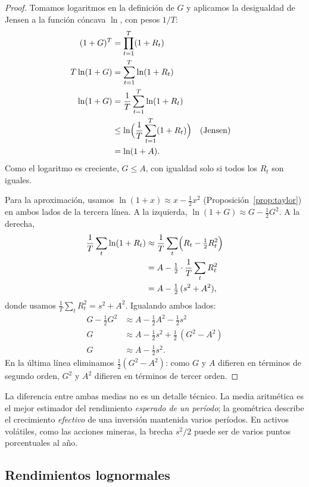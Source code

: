 \begin{proof}
Tomamos logaritmos en la definición de $G$ y aplicamos la desigualdad de Jensen a la función cóncava
$\ln$, con pesos $1/T$:
\begin{align*}
  (1+G)^T        &= \prod_{t=1}^T(1+R_t)\\
  T\ln(1+G)      &= \sum_{t=1}^T\ln(1+R_t)\\
  \ln(1+G)       &= \frac1T\sum_{t=1}^T\ln(1+R_t)\\
                 &\le \ln\Bigl(\frac1T\sum_{t=1}^T(1+R_t)\Bigr) && \text{(Jensen)}\\
                 &= \ln(1+A).
\end{align*}
Como el logaritmo es creciente, $G\le A$, con igualdad solo si todos los $R_t$ son iguales.

Para la aproximación, usamos $\ln(1+x)\approx x-\tfrac12x^2$ (Proposición~\ref{prop:taylor}) en ambos
lados de la tercera línea. A la izquierda, $\ln(1+G)\approx G-\tfrac12G^2$. A la derecha,
\begin{align*}
  \frac1T\sum_t\ln(1+R_t) &\approx \frac1T\sum_t\Bigl(R_t-\tfrac12R_t^2\Bigr)\\
                          &= A-\tfrac12\cdot\frac1T\sum_tR_t^2\\
                          &= A-\tfrac12\,(s^2+A^2),
\end{align*}
donde usamos $\frac1T\sum_tR_t^2=s^2+A^2$. Igualando ambos lados:
\begin{align*}
  G-\tfrac12G^2 &\approx A-\tfrac12A^2-\tfrac12s^2\\
  G             &\approx A-\tfrac12s^2+\tfrac12\,(G^2-A^2)\\
  G             &\approx A-\tfrac12s^2.
\end{align*}
En la última línea eliminamos $\tfrac12(G^2-A^2)$: como $G$ y $A$ difieren en términos de segundo orden,
$G^2$ y $A^2$ difieren en términos de tercer orden.
\end{proof}

La diferencia entre ambas medias no es un detalle técnico. La media aritmética es el mejor estimador del
rendimiento \emph{esperado de un período}; la geométrica describe el crecimiento \emph{efectivo} de una
inversión mantenida varios períodos. En activos volátiles, como las acciones mineras, la brecha
$s^2/2$ puede ser de varios puntos porcentuales al año.

\subsection{Rendimientos lognormales}

